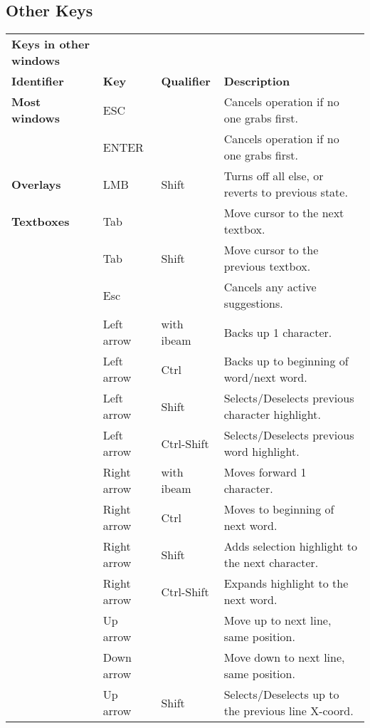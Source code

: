 \subsection*{Other Keys }%
\label{ssec:other_keys}

\begin{longtable}[h]{>{\bfseries}p{}p{}p{}p{}}
  \toprule
  \multicolumn{4}{c}%
  {\textcolor{CinRed}{\textbf{Keys in other windows}}} \\
  Identifier & \textbf{Key} & \textbf{Qualifier} & \textbf{Description}\\
  \midrule
  \endhead
  \textcolor{CinBlueText}{Most windows} & ESC &  & Cancels operation if no one grabs first. \\
  & ENTER &  & Cancels operation if no one grabs first. \\
  \midrule
  \textcolor{CinBlueText}{Overlays} & LMB & Shift & Turns off all else, or reverts to previous state. \\
  \midrule
  \textcolor{CinBlueText}{Textboxes} & Tab &  & Move cursor to the next textbox. \\
  & Tab & Shift & Move cursor to the previous textbox. \\
  & Esc &  & Cancels any active suggestions. \\
  & Left arrow & with ibeam & Backs up 1 character. \\
  & Left arrow & Ctrl & Backs up to beginning of word/next word. \\
  & Left arrow & Shift & Selects/Deselects previous character highlight. \\
  & Left arrow & Ctrl-Shift & Selects/Deselects previous word highlight. \\
  & Right arrow & with ibeam & Moves forward 1 character. \\
  & Right arrow & Ctrl & Moves to beginning of next word. \\
  & Right arrow & Shift & Adds selection highlight to the next character. \\
  & Right arrow & Ctrl-Shift & Expands highlight to the next word. \\
  & Up arrow &  & Move up to next line, same position. \\
  & Down arrow &  & Move down to next line, same position. \\
  & Up arrow & Shift & Selects/Deselects up to the previous line X-coord. \\

\end{longtable}
